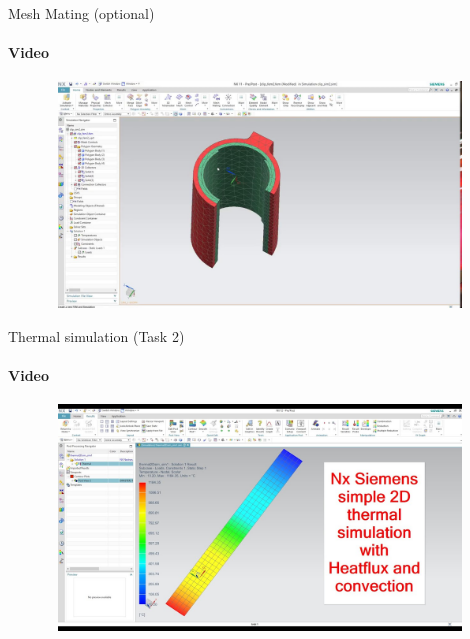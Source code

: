 \documentclass[aspectratio=169]{beamer}
\begin{document}
\begin{frame}[t]{Mesh Mating (optional)}
    \framesubtitle{Video}
    \vspace{-0.6cm}
    \begin{figure}[H]
        \href{https://youtu.be/mHD2vp394AI}{
            \centering\includegraphics[height=6cm,width=1\textwidth,keepaspectratio]{mesh_mating_video.jpg}}
        \label{fig:mesh_mating_video.jpg}
    \end{figure}
\end{frame}

\begin{frame}[t]{Thermal simulation (Task 2)}
    \framesubtitle{Video}
    \vspace{-0.6cm}
    \begin{figure}[H]
        \href{https://youtu.be/mLqTBOaz9-w}{
            \centering\includegraphics[height=6cm,width=1\textwidth,keepaspectratio]{thermal_sim_video.jpg}}
        \label{fig:thermal_sim_video.jpg}
    \end{figure}
\end{frame}
\end{document}
